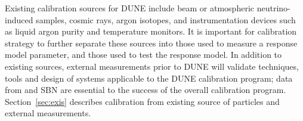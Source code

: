 Existing calibration sources for DUNE include beam or atmospheric neutrino-induced samples, cosmic rays, argon isotopes, and instrumentation devices such as liquid argon purity and temperature monitors. It is important for calibration strategy to further separate these sources into those used to measure a response model parameter, and those used to test the response model. In addition to existing sources, external measurements prior to DUNE will validate techniques, tools and design of systems applicable to the DUNE calibration program; data from   and SBN are essential to the success of the overall calibration program. %
Section~\ref{sec:exis} describes calibration from existing source of particles and external measurements.




